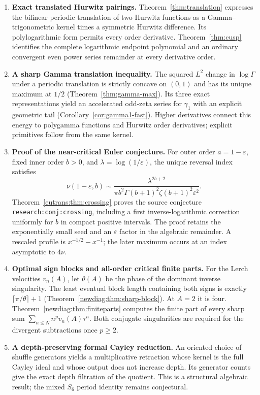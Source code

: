 \begin{enumerate}
\item \textbf{Exact translated Hurwitz pairings.}
Theorem~\ref{thm:translation} expresses the bilinear periodic translation
of two Hurwitz functions as a Gamma--trigonometric kernel times a
symmetric Hurwitz difference. Its polylogarithmic form permits every
order derivative. Theorem~\ref{thm:cusp} identifies the complete
logarithmic endpoint polynomial and an ordinary convergent even power
series remainder at every derivative order.

\item \textbf{A sharp Gamma translation inequality.}
The squared $L^2$ change in $\log\Gamma$ under a periodic translation is
strictly concave on $(0,1)$ and has its unique maximum at $1/2$
(Theorem~\ref{thm:gamma-max}). Its three exact representations yield
an accelerated odd-zeta series for $\gamma_1$ with an explicit geometric
tail (Corollary~\ref{cor:gamma1-fast}). Higher derivatives connect this
energy to polygamma functions and Hurwitz order derivatives; explicit
primitives follow from the same kernel.

\item \textbf{Proof of the near-critical Euler conjecture.}
For outer order $a=1-\varepsilon$, fixed inner order $b>0$, and
$\lambda=\log(1/\varepsilon)$, the unique reversal index satisfies
\[
 \nu(1-\varepsilon,b)\sim
 \frac{\lambda^{2b+2}}
 {\pi b^2\Gamma(b+1)^2\zeta(b+1)^2\varepsilon^2}.
\]
Theorem~\ref{eutrans:thm:crossing} proves the source conjecture
\texttt{research:conj:crossing}, including a first inverse-logarithmic
correction uniformly for $b$ in compact positive intervals. The proof
retains the exponentially small seed and an $\varepsilon$ factor in
the algebraic remainder. A rescaled profile is
$x^{-1/2}-x^{-1}$; the later maximum occurs at an index asymptotic
to $4\nu$.

\item \textbf{Optimal sign blocks and all-order critical finite parts.}
For the Lerch velocities $v_n(A)$, let $\theta(A)$ be the phase of
the dominant inverse singularity. The least eventual block length
containing both signs is exactly $\lceil\pi/\theta\rceil+1$
(Theorem~\ref{newdiag:thm:sharp-block}). At $A=2$ it is four.
Theorem~\ref{newdiag:thm:finiteparts} computes the finite part of every
sharp sum $\sum_{n\leq N}n^pv_n(A)\tau^n$. Both conjugate singularities
are required for the divergent subtractions once $p\geq2$.

\item \textbf{A depth-preserving formal Cayley reduction.}
An oriented choice of shuffle generators yields a multiplicative
retraction whose kernel is the full Cayley ideal and whose output
does not increase depth. Its generator counts give the exact depth
filtration of the quotient. This is a structural algebraic result;
the mixed $S_6$ period identity remains conjectural.
\end{enumerate}


